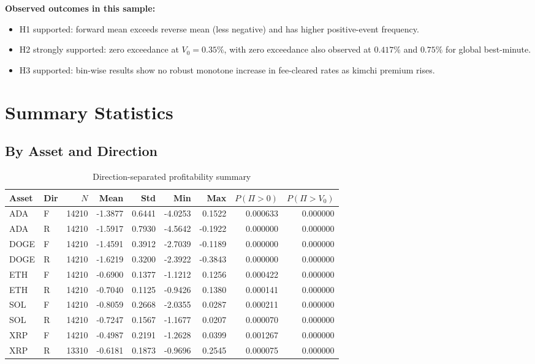 \documentclass[11pt,a4paper]{article}
\begin{document}
\noindent\textbf{Observed outcomes in this sample:}
\begin{itemize}
    \item H1 supported: forward mean exceeds reverse mean (less negative) and has higher positive-event frequency.
    \item H2 strongly supported: zero exceedance at $V_0=0.35\%$, with zero exceedance also observed at $0.417\%$ and $0.75\%$ for global best-minute.
    \item H3 supported: bin-wise results show no robust monotone increase in fee-cleared rates as kimchi premium rises.
\end{itemize}

\section{Summary Statistics}

\subsection{By Asset and Direction}
\begin{table}[H]
\centering
\caption{Direction-separated profitability summary}
\begin{tabular}{l l r r r r r r r}
\toprule
Asset & Dir & $N$ & Mean & Std & Min & Max & $P(\Pi>0)$ & $P(\Pi>V_0)$ \\
\midrule
ADA & F & 14210 & -1.3877 & 0.6441 & -4.0253 & 0.1522 & 0.000633 & 0.000000 \\
ADA & R & 14210 & -1.5917 & 0.7930 & -4.5642 & -0.1922 & 0.000000 & 0.000000 \\
DOGE & F & 14210 & -1.4591 & 0.3912 & -2.7039 & -0.1189 & 0.000000 & 0.000000 \\
DOGE & R & 14210 & -1.6219 & 0.3200 & -2.3922 & -0.3843 & 0.000000 & 0.000000 \\
ETH & F & 14210 & -0.6900 & 0.1377 & -1.1212 & 0.1256 & 0.000422 & 0.000000 \\
ETH & R & 14210 & -0.7040 & 0.1125 & -0.9426 & 0.1380 & 0.000141 & 0.000000 \\
SOL & F & 14210 & -0.8059 & 0.2668 & -2.0355 & 0.0287 & 0.000211 & 0.000000 \\
SOL & R & 14210 & -0.7247 & 0.1567 & -1.1677 & 0.0207 & 0.000070 & 0.000000 \\
XRP & F & 14210 & -0.4987 & 0.2191 & -1.2628 & 0.0399 & 0.001267 & 0.000000 \\
XRP & R & 13310 & -0.6181 & 0.1873 & -0.9696 & 0.2545 & 0.000075 & 0.000000 \\
\bottomrule
\end{tabular}
\end{table}
\end{document}

